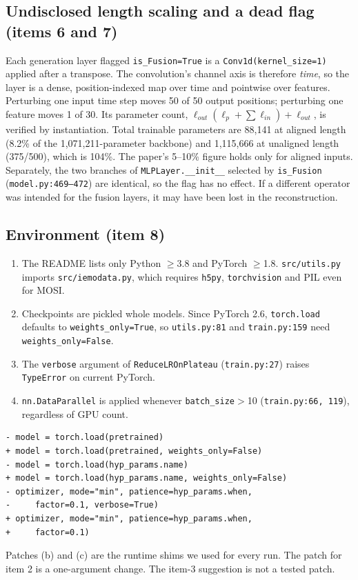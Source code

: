 \documentclass[lettersize,journal]{IEEEtran}
\begin{document}
\subsection{Undisclosed length scaling and a dead flag (items 6 and 7)}
Each generation layer flagged \texttt{is\_Fusion=True} is a \texttt{Conv1d(kernel\_size=1)} applied after a transpose. The convolution's channel axis is therefore \emph{time}, so the layer is a dense, position-indexed map over time and pointwise over features. Perturbing one input time step moves 50 of 50 output positions; perturbing one feature moves 1 of 30. Its parameter count, $\ell_{out}(\ell_p+\sum\ell_{in})+\ell_{out}$, is verified by instantiation. Total trainable parameters are 88,141 at aligned length (8.2\% of the 1,071,211-parameter backbone) and 1,115,666 at unaligned length (375/500), which is 104\%. The paper's 5--10\% figure holds only for aligned inputs. Separately, the two branches of \texttt{MLPLayer.\_\_init\_\_} selected by \texttt{is\_Fusion} (\texttt{model.py:469--472}) are identical, so the flag has no effect. If a different operator was intended for the fusion layers, it may have been lost in the reconstruction.

\subsection{Environment (item 8)}
\begin{enumerate}
\item[a)] The README lists only Python $\ge$3.8 and PyTorch $\ge$1.8. \texttt{src/utils.py} imports \texttt{src/iemodata.py}, which requires \texttt{h5py}, \texttt{torchvision} and PIL even for MOSI.
\item[b)] Checkpoints are pickled whole models. Since PyTorch 2.6, \texttt{torch.load} defaults to \texttt{weights\_only=True}, so \texttt{utils.py:81} and \texttt{train.py:159} need \texttt{weights\_only=False}.
\item[c)] The \texttt{verbose} argument of \texttt{ReduceLROnPlateau} (\texttt{train.py:27}) raises \texttt{TypeError} on current PyTorch.
\item[d)] \texttt{nn.DataParallel} is applied whenever \texttt{batch\_size}$>$10 (\texttt{train.py:66, 119}), regardless of GPU count.
\end{enumerate}
\begin{Verbatim}
- model = torch.load(pretrained)
+ model = torch.load(pretrained, weights_only=False)
- model = torch.load(hyp_params.name)
+ model = torch.load(hyp_params.name, weights_only=False)
- optimizer, mode="min", patience=hyp_params.when,
-     factor=0.1, verbose=True)
+ optimizer, mode="min", patience=hyp_params.when,
+     factor=0.1)
\end{Verbatim}
Patches (b) and (c) are the runtime shims we used for every run. The patch for item 2 is a one-argument change. The item-3 suggestion is not a tested patch.
\end{document}

